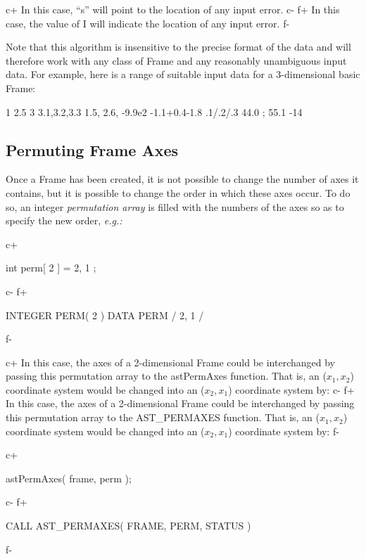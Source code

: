 \documentclass[twoside,11pt]{starlink}
\begin{document}
c+
In this case, ``s'' will point to the location of any input error.
c-
f+
In this case, the value of I will indicate the location of any input error.
f-

Note that this algorithm is insensitive to the precise format of the
data and will therefore work with any class of Frame and any
reasonably unambiguous input data. For example, here is a range of
suitable input data for a 3-dimensional basic Frame:

\small
\begin{terminalv}
1 2.5 3
3.1,3.2,3.3
1.5, 2.6, -9.9e2
-1.1+0.4-1.8
    .1/.2/.3
 44.0 ; 55.1 -14
\end{terminalv}
\normalsize

\subsection{\label{ss:permutingaxes}Permuting Frame Axes}

Once a Frame has been created, it is not possible to change the number
of axes it contains, but it is possible to change the order in which
these axes occur. To do so, an integer \emph{permutation array} is
filled with the numbers of the axes so as to specify the new order,
\emph{e.g.:}

c+
\small
\begin{terminalv}
int perm[ 2 ] = { 2, 1 };
\end{terminalv}
\normalsize
c-
f+
\small
\begin{terminalv}
      INTEGER PERM( 2 )
      DATA PERM / 2, 1 /
\end{terminalv}
\normalsize
f-

c+
In this case, the axes of a 2-dimensional Frame could be interchanged
by passing this permutation array to the astPermAxes function. That
is, an ($x_1,x_2$) coordinate system would be changed into an
($x_2,x_1$) coordinate system by:
c-
f+
In this case, the axes of a 2-dimensional Frame could be interchanged
by passing this permutation array to the AST\_PERMAXES function. That
is, an ($x_1,x_2$) coordinate system would be changed into an
($x_2,x_1$) coordinate system by:
f-

c+
\small
\begin{terminalv}
astPermAxes( frame, perm );
\end{terminalv}
\normalsize
c-
f+
\small
\begin{terminalv}
      CALL AST_PERMAXES( FRAME, PERM, STATUS )
\end{terminalv}
\normalsize
f-
\end{document}

